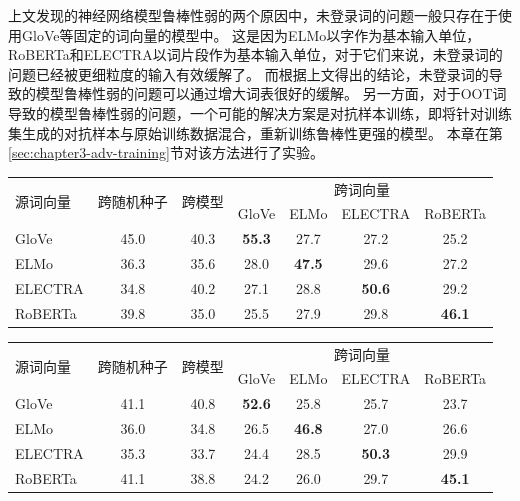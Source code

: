 上文发现的神经网络模型鲁棒性弱的两个原因中，未登录词的问题一般只存在于使用GloVe等固定的词向量的模型中。
这是因为ELMo以字作为基本输入单位，RoBERTa和ELECTRA以词片段作为基本输入单位，对于它们来说，未登录词的问题已经被更细粒度的输入有效缓解了。
而根据上文得出的结论，未登录词的导致的模型鲁棒性弱的问题可以通过增大词表很好的缓解。
另一方面，对于OOT词导致的模型鲁棒性弱的问题，一个可能的解决方案是对抗样本训练，即将针对训练集生成的对抗样本与原始训练数据混合，重新训练鲁棒性更强的模型。
本章在第\ref{sec:chapter3-adv-training}节对该方法进行了实验。

\begin{table}[h]
    \vspace{0.5em}\centering\wuhao
	\begin{tabular}{lcccccc}
		\toprule[1.5pt]
		\multirow{2}{*}{源词向量}& \multirow{2}{*}{跨随机种子} & \multirow{2}{*}{跨模型} & \multicolumn{4}{c}{跨词向量} \\
		\cline{4-7}
		& &  & GloVe & ELMo & ELECTRA & RoBERTa \\
		\midrule[1pt]
		GloVe &45.0  &40.3  &\bf 55.3 &27.7 &27.2 &25.2 \\
		ELMo &36.3  &35.6  &28.0 &\bf 47.5 &29.6 &27.2 \\
		ELECTRA &34.8  &40.2  &27.1 &28.8 &\bf 50.6 &29.2 \\
		RoBERTa &39.8  &35.0  &25.5 &27.9 &29.8 &\bf 46.1 \\
		\bottomrule[1.5pt]
	\end{tabular}
\end{table}

\begin{table}[h]
    \vspace{0.5em}\centering\wuhao
	\begin{tabular}{lcccccc}
		\toprule[1.5pt]
		\multirow{2}{*}{源词向量}& \multirow{2}{*}{跨随机种子} & \multirow{2}{*}{跨模型} & \multicolumn{4}{c}{跨词向量} \\
		\cline{4-7}
		& &  & GloVe & ELMo & ELECTRA & RoBERTa \\
		\midrule[1pt]
		GloVe &41.1  &40.8  &\bf 52.6 &25.8 &25.7 &23.7 \\
		ELMo &36.0  &34.8  &26.5 &\bf 46.8 &27.0 &26.6 \\
		ELECTRA &35.3  &33.7  &24.4 &28.5 &\bf 50.3 &29.9 \\
		RoBERTa &41.1  &38.8  &24.2 &26.0 &29.7 &\bf 45.1 \\
		\bottomrule[1.5pt]
	\end{tabular}
\end{table}

